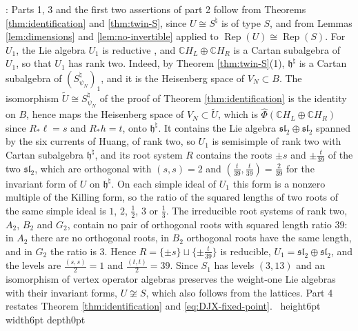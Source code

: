 \documentclass[leqno]{article}
\newcommand{\Cbb}{\ensuremath{\mathbb{C}}}
\newcommand{\qed}{\hfill \vrule height6pt  width6pt depth0pt}
\DeclareMathOperator{\Rep}{Rep}
\newenvironment{proof}[1][]{\noindent {\it Proof #1} : }{\hbox{~}\qed
\smallskip
}
\numberwithin{equation}{section}
\begin{document}
\begin{proof}
Parts 1, 3 and the first two assertions of part 2 follow from Theorems \ref{thm:identification} and \ref{thm:twin-S}, since $U \cong S^\natural$ is of type $S$, and from Lemmas \ref{lem:dimensions} and \ref{lem:no-invertible} applied to $\Rep(U) \cong \Rep(S)$. For $U_1$, the Lie algebra $U_1$ is reductive \cite[Theorem 1]{DoM04}, and $\Cbb H_L \oplus \Cbb H_R$ is a Cartan subalgebra of $U_1$, so that $U_1$ has rank two. Indeed, by Theorem \ref{thm:twin-S}(1), $\mathfrak h^\natural$ is a Cartan subalgebra of $(S^\natural_{\psi_N})_1$, and it is the Heisenberg space of $V_N \subset B$. The isomorphism $\tilde U \cong S^\natural_{\psi_N}$ of the proof of Theorem \ref{thm:identification} is the identity on $B$, hence maps the Heisenberg space of $V_N \subset \tilde U$, which is $\hat\Phi(\Cbb H_L \oplus \Cbb H_R)$ since $R_*\ell = s$ and $R_*h = t$, onto $\mathfrak h^\natural$. It contains the Lie algebra $\mathfrak{sl}_2 \oplus \mathfrak{sl}_2$ spanned by the six currents of Huang, of rank two, so $U_1$ is semisimple of rank two with Cartan subalgebra $\mathfrak h^\natural$, and its root system $R$ contains the roots $\pm s$ and $\pm\frac{t}{39}$ of the two $\mathfrak{sl}_2$, which are orthogonal with $(s,s) = 2$ and $(\frac t{39},\frac t{39}) = \frac2{39}$ for the invariant form of $U$ on $\mathfrak h^\natural$. On each simple ideal of $U_1$ this form is a nonzero multiple of the Killing form, so the ratio of the squared lengths of two roots of the same simple ideal is $1$, $2$, $\frac12$, $3$ or $\frac13$. The irreducible root systems of rank two, $A_2$, $B_2$ and $G_2$, contain no pair of orthogonal roots with squared length ratio $39$: in $A_2$ there are no orthogonal roots, in $B_2$ orthogonal roots have the same length, and in $G_2$ the ratio is $3$. Hence $R = \{\pm s\} \sqcup \{\pm\frac t{39}\}$ is reducible, $U_1 = \mathfrak{sl}_2 \oplus \mathfrak{sl}_2$, and the levels are $\frac{(s,s)}2 = 1$ and $\frac{(t,t)}2 = 39$. Since $S_1$ has levels $(3,13)$ and an isomorphism of vertex operator algebras preserves the weight-one Lie algebras with their invariant forms, $U \not\cong S$, which also follows from the lattices. Part 4 restates Theorem \ref{thm:identification} and \eqref{eq:DJX-fixed-point}.
\end{proof}
\end{document}
